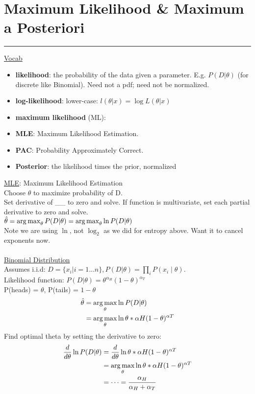 \section{Maximum Likelihood \& Maximum a Posteriori}
\smallskip \hrule height 2pt \smallskip

\underline{Vocab}
\begin{itemize}
	\item\textbf{likelihood}: the probability of the data given a parameter.  E.g. $P(D | \theta)$ (for discrete like Binomial).  
	Need not a pdf; need not be normalized.   %
 	\item \textbf{log-likelihood}: lower-case: $l(\theta|x) = \log L(\theta | x)$
	\item \textbf{maximum likelihood} (ML): 
	\item \textbf{MLE}: Maximum Likelihood Estimation. 
	\item \textbf{PAC}: Probability Approximately Correct. 
	\item \textbf{Posterior}: the likelihood times the prior, normalized  %
\end{itemize}
 
\underline{MLE}: Maximum Likelihood Estimation \hfill \\
Choose $\theta$ to maximize probability of D. \hfill \\
Set derivative of \_\_ to zero and solve.  If function is multivariate, set each partial derivative to zero and solve. \hfill \\
$\hat{\theta} = \operatorname*{arg\,max}_\theta P(D | \theta) = \operatorname*{arg\,max}_\theta \ln P(D | \theta) $ \hfill \\
Note we are using $\ln$, not $\log_2$ as we did for entropy above.  Want it to cancel exponents now. 
 \hfill \\
 
\hfill \\
\underline{Binomial Distribution} \hfill \\
Assumes i.i.d: $D=\{x_i | i=1 \dots n\}, P(D | \theta) = \prod_i P(x_i \mid \theta)$. \hfill \\
Likelihood function: $P(D | \theta) = \theta^{\alpha_H} (1-\theta)^{\alpha_T}$  \hfill \\
P(heads) = $\theta$, P(tails) = $1 - \theta$ \hfill \\
\begin{align*} 
	\hat{\theta} &= \operatorname*{arg\,max}_\theta \ln P(D| \theta) \\
	 	 &= \operatorname*{arg\,max}_\theta \ln \theta*{\alpha H}(1-\theta)^{\alpha T}
\end{align*}
Find optimal theta by setting the derivative to zero: 
\begin{align*} 
	\frac{d}{d\theta} \ln P(D| \theta) &= \frac{d}{d\theta}  \ln \theta*{\alpha H}(1-\theta)^{\alpha T} \\
	 	 &= \operatorname*{arg\,max}_\theta \ln \theta*{\alpha H}(1-\theta)^{\alpha T} \\
		 & = \dots = \frac{\alpha_H}{\alpha_H  + \alpha_T}
\end{align*}

